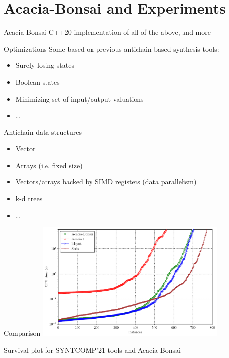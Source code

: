 \documentclass[aspectratio=169]{beamer}
\begin{document}
\section{Acacia-Bonsai and Experiments}


\begin{frame}{Acacia-Bonsai}
  C++20 implementation of all of the above, and more

  \begin{block}{Optimizations}
    Some based on previous antichain-based synthesis tools:
    \begin{itemize}
      \item Surely losing states
      \item Boolean states
      \item Minimizing set of input/output valuations
      \item \dots
    \end{itemize}
  \end{block}

  \pause
  \begin{block}{Antichain data structures}
    \begin{itemize}
      \item Vector
      \item Arrays (i.e. fixed size)
      \item Vectors/arrays backed by SIMD registers (data parallelism)
      \item k-d trees
      \item \dots
    \end{itemize}
  \end{block}
\end{frame}


\begin{frame}{Comparison}
  \centering
  \includegraphics[width=0.7\textwidth]{../doc/tacas23/img/cactus}

  Survival plot for SYNTCOMP'21 tools and Acacia-Bonsai
\end{frame}
\end{document}
